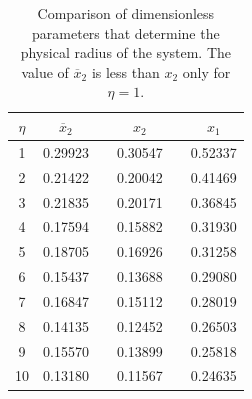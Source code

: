 \documentclass[fleqn]{article}
\begin{document}
            \begin{table}[H]
                \centering
                \caption{Comparison of dimensionless parameters that determine the physical radius of the system. The value of $\overline{x}_{2}$ is less than $x_{2}$ only for $\eta = 1$.}
                 \vspace{0.85cm}
                    \begin{tabular}{c c c c c  c }
                    \hline
                    $\eta$   & $\overline{x}_{2}$  & & $x_{2}$ & & $x_{1}$ \\
                    \hline
                    1    & 0.29923 & &  0.30547  & & 0.52337  \\
                    2    & 0.21422 & &  0.20042  & & 0.41469  \\
                    3    & 0.21835 & & 0.20171   & & 0.36845 \\
                    4    & 0.17594 & & 0.15882   & & 0.31930 \\
                    5    &  0.18705 & & 0.16926   & &  0.31258 \\
                    6    & 0.15437 & & 0.13688   & &  0.29080\\
                    7    & 0.16847 & & 0.15112   & & 0.28019 \\
                    8    & 0.14135 & & 0.12452   & &  0.26503 \\
                    9    & 0.15570 & & 0.13899   & &  0.25818 \\
                    10    & 0.13180 & & 0.11567   & &  0.24635 \\
                    \hline
                    \end{tabular}
            \label{tab:physical_radius_comparison}        
            \end{table}
\end{document}

